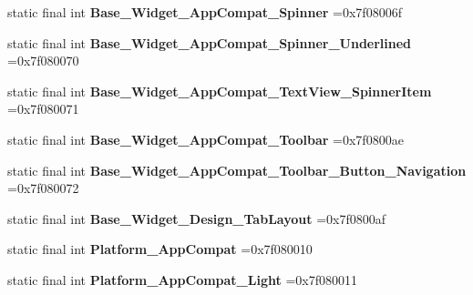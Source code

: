 \begin{DoxyCompactItemize}
\item 
\hypertarget{classcheck_1_1test_1_1_r_1_1style_a1d654e004b86c45894d9e83c968963f0}{}static final int {\bfseries Base\+\_\+\+Widget\+\_\+\+App\+Compat\+\_\+\+Spinner} =0x7f08006f\label{classcheck_1_1test_1_1_r_1_1style_a1d654e004b86c45894d9e83c968963f0}

\item 
\hypertarget{classcheck_1_1test_1_1_r_1_1style_a1a06d76b5e58abea894c8555177248e4}{}static final int {\bfseries Base\+\_\+\+Widget\+\_\+\+App\+Compat\+\_\+\+Spinner\+\_\+\+Underlined} =0x7f080070\label{classcheck_1_1test_1_1_r_1_1style_a1a06d76b5e58abea894c8555177248e4}

\item 
\hypertarget{classcheck_1_1test_1_1_r_1_1style_a8fe5c628713c0773d9c6147ee1d21bda}{}static final int {\bfseries Base\+\_\+\+Widget\+\_\+\+App\+Compat\+\_\+\+Text\+View\+\_\+\+Spinner\+Item} =0x7f080071\label{classcheck_1_1test_1_1_r_1_1style_a8fe5c628713c0773d9c6147ee1d21bda}

\item 
\hypertarget{classcheck_1_1test_1_1_r_1_1style_ac135f9a39040f465ee06becfd99019e8}{}static final int {\bfseries Base\+\_\+\+Widget\+\_\+\+App\+Compat\+\_\+\+Toolbar} =0x7f0800ae\label{classcheck_1_1test_1_1_r_1_1style_ac135f9a39040f465ee06becfd99019e8}

\item 
\hypertarget{classcheck_1_1test_1_1_r_1_1style_acbd6640d79fef5fc16cc45edb7885d5a}{}static final int {\bfseries Base\+\_\+\+Widget\+\_\+\+App\+Compat\+\_\+\+Toolbar\+\_\+\+Button\+\_\+\+Navigation} =0x7f080072\label{classcheck_1_1test_1_1_r_1_1style_acbd6640d79fef5fc16cc45edb7885d5a}

\item 
\hypertarget{classcheck_1_1test_1_1_r_1_1style_a4c1cb6671e897a950e3e81b3f77a3651}{}static final int {\bfseries Base\+\_\+\+Widget\+\_\+\+Design\+\_\+\+Tab\+Layout} =0x7f0800af\label{classcheck_1_1test_1_1_r_1_1style_a4c1cb6671e897a950e3e81b3f77a3651}

\item 
\hypertarget{classcheck_1_1test_1_1_r_1_1style_aa57ac80070c2ef41ccedeb7f0b8f4528}{}static final int {\bfseries Platform\+\_\+\+App\+Compat} =0x7f080010\label{classcheck_1_1test_1_1_r_1_1style_aa57ac80070c2ef41ccedeb7f0b8f4528}

\item 
\hypertarget{classcheck_1_1test_1_1_r_1_1style_acc186c310e19c7ac0d6af4b394b467e5}{}static final int {\bfseries Platform\+\_\+\+App\+Compat\+\_\+\+Light} =0x7f080011\label{classcheck_1_1test_1_1_r_1_1style_acc186c310e19c7ac0d6af4b394b467e5}


\end{DoxyCompactItemize}
